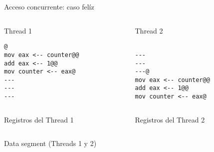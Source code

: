\begin{frame}[fragile]{Acceso concurrente: caso fel\'iz}
   \begin{columns}
      \begin{column}{.5\linewidth}
          Thread 1
         \begin{lstlisting}[style=dimmided,firstnumber=0]
         @
mov eax <-- counter@@
add eax <-- 1@@
mov counter <-- eax@
---
---
---
         \end{lstlisting}
      \end{column}
      \begin{column}{.45\linewidth}
          Thread 2
         \begin{lstlisting}[style=dimmided,firstnumber=0]

---
---
---@
mov eax <-- counter@@
add eax <-- 1@@
mov counter <-- eax@
         \end{lstlisting}
      \end{column}
   \end{columns}
    \vspace{1em}
   \begin{columns}
      \begin{column}{.5\linewidth}
          Registros del Thread 1\\
      \end{column}
      \begin{column}{.45\linewidth}
          Registros del Thread 2\\
      \end{column}
   \end{columns}
    \vspace{1.4em}
    \centering
   \begin{columns}
      \begin{column}{.5\linewidth}
          Data segment (Threads 1 y 2)\\
      \end{column}
   \end{columns}
\end{frame}

